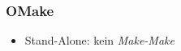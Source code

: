 \begin{frame}
	\frametitle{OMake}
	\begin{itemize}
		\item Stand-Alone: kein \emph{Make-Make}
	\end{itemize}
\end{frame}
